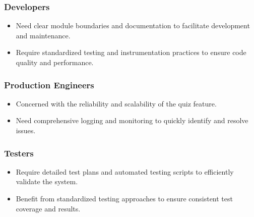 \documentclass{article}
\begin{document}
\subsubsection{Developers}

\begin{itemize}
  \item Need clear module boundaries and documentation to facilitate development and maintenance.
  \item Require standardized testing and instrumentation practices to ensure code quality and performance.
\end{itemize}

\subsubsection{Production Engineers}

\begin{itemize}
  \item Concerned with the reliability and scalability of the quiz feature.
  \item Need comprehensive logging and monitoring to quickly identify and resolve issues.
\end{itemize}

\subsubsection{Testers}

\begin{itemize}
  \item Require detailed test plans and automated testing scripts to efficiently validate the system.
  \item Benefit from standardized testing approaches to ensure consistent test coverage and results.
\end{itemize}
\end{document}
